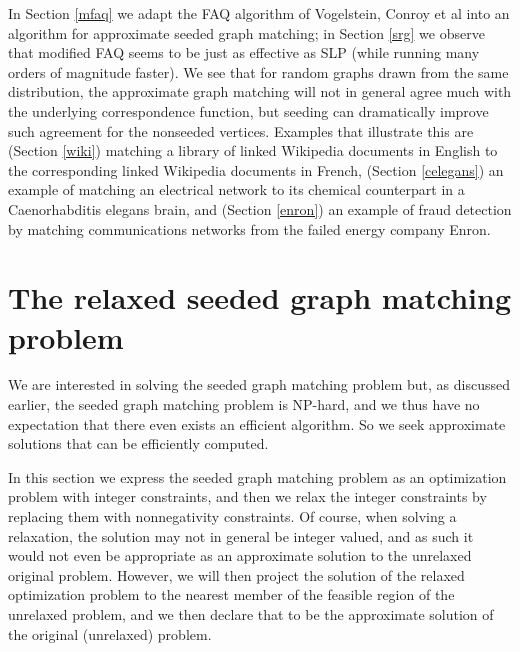 \documentclass[12pt]{article}
\begin{document}
In Section \ref{mfaq} we adapt the FAQ algorithm of
Vogelstein, Conroy et al into an algorithm for approximate
seeded graph matching; in Section \ref{srg} we observe that
modified FAQ seems to be just as effective as SLP (while running
many orders of magnitude faster). We see that for random graphs
drawn from the same distribution, the approximate graph matching
will not in general agree much with the underlying correspondence
function, but seeding can dramatically improve such agreement
for the nonseeded vertices. Examples that illustrate this
are (Section \ref{wiki}) matching a library of linked Wikipedia
documents in English to the corresponding linked Wikipedia documents
in French, (Section \ref{celegans}) an example
of matching an electrical network to its chemical counterpart in
a Caenorhabditis elegans brain, and (Section \ref{enron}) an example
of fraud detection by matching communications networks from the failed
energy company Enron.

\newpage

\section{The relaxed seeded graph matching problem \label{mfo}}

We are interested in solving the seeded graph matching problem but, as
discussed earlier, the seeded graph matching problem is NP-hard,
and we thus have no expectation that there even exists an efficient
algorithm. So we seek approximate solutions that can be
efficiently computed.

In this section we express the seeded graph matching
problem as an optimization problem with integer constraints, and then
we relax the integer constraints by replacing them with nonnegativity
constraints. Of course, when solving a relaxation, the solution
may not in general be integer valued, and as such it would not even
be appropriate as an approximate solution to the unrelaxed original
problem. However, we will then project the solution of the relaxed
optimization problem to the nearest member of the feasible
region of the unrelaxed problem, and we then declare that to be the
approximate solution of the original (unrelaxed) problem.
\end{document}

